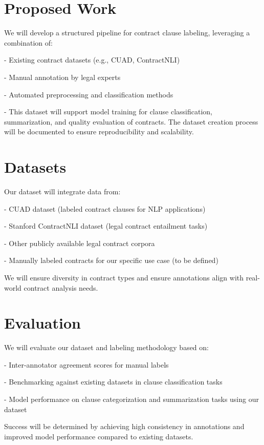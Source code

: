 \documentclass[11pt, oneside]{article}   	%
\begin{document}
\section*{Proposed Work}
We will develop a structured pipeline for contract clause labeling, leveraging a combination of:

- Existing contract datasets (e.g., CUAD, ContractNLI)

- Manual annotation by legal experts

- Automated preprocessing and classification methods

- This dataset will support model training for clause classification, summarization, and quality evaluation of contracts. The dataset creation process will be documented to ensure reproducibility and scalability.

\section*{Datasets}
Our dataset will integrate data from:

- CUAD dataset (labeled contract clauses for NLP applications)

- Stanford ContractNLI dataset (legal contract entailment tasks)

- Other publicly available legal contract corpora

- Manually labeled contracts for our specific use case (to be defined)

We will ensure diversity in contract types and ensure annotations align with real-world contract analysis needs.

\section*{Evaluation}
We will evaluate our dataset and labeling methodology based on:

- Inter-annotator agreement scores for manual labels

- Benchmarking against existing datasets in clause classification tasks

- Model performance on clause categorization and summarization tasks using our dataset

Success will be determined by achieving high consistency in annotations and improved model performance compared to existing datasets.
\end{document}
